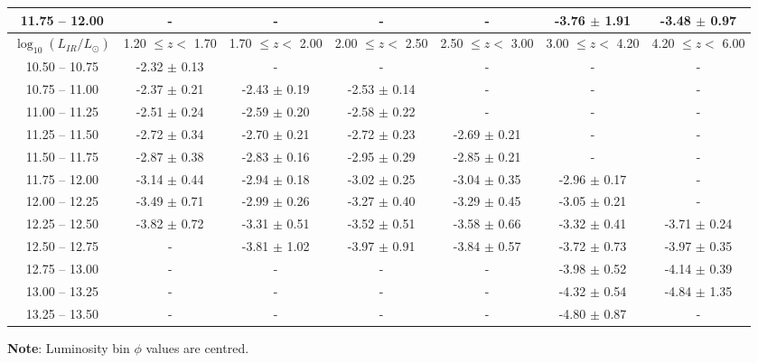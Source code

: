 \begin{table*}
\begin{center}
\begin{tabular}{@{}ccccccc@{}}
        11.75 -- 12.00 & -                & -                & -                & -                & -3.76 $\pm$ 1.91 & -3.48 $\pm$ 0.97 \\
        \hline
        $\log_{10}(L_{IR}/L_{\odot})$ & 1.20 $\leq z <$ 1.70 & 1.70 $\leq z <$ 2.00 & 2.00 $\leq z <$ 2.50 & 2.50 $\leq z <$ 3.00 & 3.00 $\leq z <$ 4.20 & 4.20 $\leq z <$ 6.00  \\
        \hline
        10.50 -- 10.75 & -2.32 $\pm$ 0.13 & - & - & - & - & - \\
        10.75 -- 11.00 & -2.37 $\pm$ 0.21 & -2.43 $\pm$ 0.19 & -2.53 $\pm$ 0.14 & - & - & - \\
        11.00 -- 11.25 & -2.51 $\pm$ 0.24 & -2.59 $\pm$ 0.20 & -2.58 $\pm$ 0.22 & - & - & - \\
        11.25 -- 11.50 & -2.72 $\pm$ 0.34 & -2.70 $\pm$ 0.21 & -2.72 $\pm$ 0.23 & -2.69 $\pm$ 0.21 & - & - \\
        11.50 -- 11.75 & -2.87 $\pm$ 0.38 & -2.83 $\pm$ 0.16 & -2.95 $\pm$ 0.29 & -2.85 $\pm$ 0.21 & - & - \\
        11.75 -- 12.00 & -3.14 $\pm$ 0.44 & -2.94 $\pm$ 0.18 & -3.02 $\pm$ 0.25 & -3.04 $\pm$ 0.35 & -2.96 $\pm$ 0.17 & - \\
        12.00 -- 12.25 & -3.49 $\pm$ 0.71 & -2.99 $\pm$ 0.26 & -3.27 $\pm$ 0.40 & -3.29 $\pm$ 0.45 & -3.05 $\pm$ 0.21 & - \\
        12.25 -- 12.50 & -3.82 $\pm$ 0.72 & -3.31 $\pm$ 0.51 & -3.52 $\pm$ 0.51 & -3.58 $\pm$ 0.66 & -3.32 $\pm$ 0.41 & -3.71 $\pm$ 0.24 \\
        12.50 -- 12.75 & -                & -3.81 $\pm$ 1.02 & -3.97 $\pm$ 0.91 & -3.84 $\pm$ 0.57 & -3.72 $\pm$ 0.73 & -3.97 $\pm$ 0.35 \\
        12.75 -- 13.00 & -                & -                & -                & -                & -3.98 $\pm$ 0.52 & -4.14 $\pm$ 0.39 \\
        13.00 -- 13.25 & -                & -                & -                & -                & -4.32 $\pm$ 0.54 & -4.84 $\pm$ 1.35 \\
        13.25 -- 13.50 & -                & -                & -                & -                & -4.80 $\pm$ 0.87 & -
        \botrule
    \end{tabular}
    \end{center}
    \begin{tabnote}
        {\textbf{Note}: Luminosity bin $\phi$ values are centred.}\tnp
    \end{tabnote}
\end{table*}

